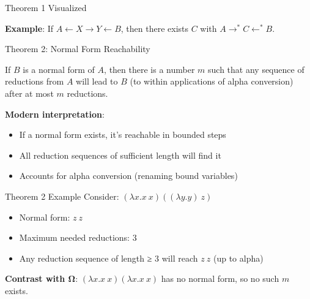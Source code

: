 \documentclass[10pt]{beamer}
\begin{document}
\begin{frame}{Theorem 1 Visualized}
\begin{center}
\end{center}

\textbf{Example}: If \(A \leftarrow X \rightarrow Y \leftarrow B\), then there exists \(C\) with \(A \rightarrow^* C \leftarrow^* B\).
\end{frame}

\begin{frame}{Theorem 2: Normal Form Reachability}
\begin{theorem}
If \(B\) is a normal form of \(A\), then there is a number \(m\) such that any sequence of reductions from \(A\) will lead to \(B\) (to within applications of alpha conversion) after at most \(m\) reductions.
\end{theorem}

\vspace{0.3cm}
\textbf{Modern interpretation}: 
\begin{itemize}
\item If a normal form exists, it's reachable in bounded steps
\item All reduction sequences of sufficient length will find it
\item Accounts for alpha conversion (renaming bound variables)
\end{itemize}
\end{frame}

\begin{frame}{Theorem 2 Example}
Consider: \((\lambda x.x\ x)((\lambda y.y)\ z)\)

\begin{itemize}
\item Normal form: \(z\ z\)
\item Maximum needed reductions: 3
\item Any reduction sequence of length ≥ 3 will reach \(z\ z\) (up to alpha)
\end{itemize}

\vspace{0.3cm}
\textbf{Contrast with Ω}: \((\lambda x.x\ x)(\lambda x.x\ x)\) has no normal form, so no such \(m\) exists.
\end{frame}
\end{document}
